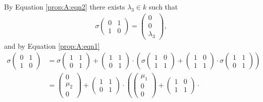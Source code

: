By Equation \ref{prop:A:eqn2} there exists $\lambda_3 \in k$ such that
\begin{align*}
\sigma\left(\begin{matrix}0 & 1\\1 & 0\end{matrix}\right) = \left(\begin{matrix}0\\0\\ \lambda_3\end{matrix}\right),
\end{align*}
and by Equation \ref{prop:A:eqn1}
\begin{align*}
\sigma\left(
	\begin{matrix} 0 & 1 \\ 1 & 0 \end{matrix}
\right)
&=
\sigma
	\left(\begin{matrix} 1 & 1 \\ 0 & 1 \end{matrix}\right)
 +
\left(\begin{matrix} 1 & 1 \\ 0 & 1 \end{matrix}\right) \cdot
\left(
	\sigma
		\left(\begin{matrix} 1 & 0 \\ 1 & 1 \end{matrix}
	\right) +
	\left(\begin{matrix} 1 & 0 \\ 1 & 1 \end{matrix}\right)\cdot
	\sigma
		\left(\begin{matrix} 1 & 1 \\ 0 & 1 \end{matrix}\right)
\right)\\ 
&=
\left(\begin{matrix} 0 \\ \mu_2 \\ 0 \end{matrix}\right)
+
\left(\begin{matrix} 1 & 1 \\ 0 & 1 \end{matrix}\right) \cdot
\left(
	\left(\begin{matrix} \mu_1 \\ 0 \\ 0 \end{matrix}\right)
	+
	\left(\begin{matrix} 1 & 0 \\ 1 & 1 \end{matrix}\right)\cdot

\end{align*}
